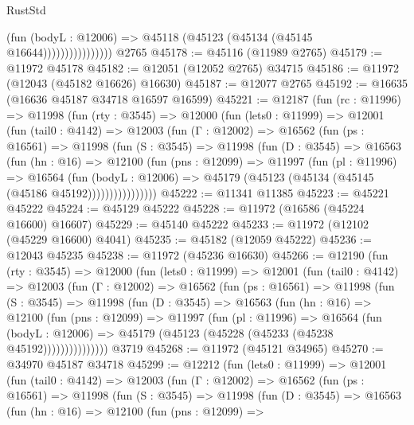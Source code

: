 \begin{lexlean}{RustStd}
\begin{coremodule}
                            (fun (bodyL : @12006) =>
                            @45118 (@45123 (@45134 (@45145 @16644))))))))))))))))
    @2765
@45178 := @45116 (@11989 @2765)
@45179 := @11972 @45178
@45182 := @12051 (@12052 @2765) @34715
@45186 := @11972 (@12043 (@45182 @16626) @16630)
@45187 := @12077 @2765
@45192 := @16635 (@16636 @45187 @34718 @16597 @16599)
@45221 := @12187
    (fun (rc : @11996) =>
    @11998
      (fun (rty : @3545) =>
      @12000
        (fun (lets0 : @11999) =>
        @12001
          (fun (tail0 : @4142) =>
          @12003
            (fun (Γ : @12002) =>
            @16562
              (fun (ps : @16561) =>
              @11998
                (fun (S : @3545) =>
                @11998
                  (fun (D : @3545) =>
                  @16563
                    (fun (hn : @16) =>
                    @12100
                      (fun (pns : @12099) =>
                      @11997
                        (fun (pl : @11996) =>
                        @16564
                          (fun (bodyL : @12006) =>
                          @45179 (@45123 (@45134 (@45145 (@45186 @45192))))))))))))))))
@45222 := @11341 @11385
@45223 := @45221 @45222
@45224 := @45129 @45222
@45228 := @11972 (@16586 (@45224 @16600) @16607)
@45229 := @45140 @45222
@45233 := @11972 (@12102 (@45229 @16600) @4041)
@45235 := @45182 (@12059 @45222)
@45236 := @12043 @45235
@45238 := @11972 (@45236 @16630)
@45266 := @12190
    (fun (rty : @3545) =>
    @12000
      (fun (lets0 : @11999) =>
      @12001
        (fun (tail0 : @4142) =>
        @12003
          (fun (Γ : @12002) =>
          @16562
            (fun (ps : @16561) =>
            @11998
              (fun (S : @3545) =>
              @11998
                (fun (D : @3545) =>
                @16563
                  (fun (hn : @16) =>
                  @12100
                    (fun (pns : @12099) =>
                    @11997
                      (fun (pl : @11996) =>
                      @16564
                        (fun (bodyL : @12006) =>
                        @45179 (@45123 (@45228 (@45233 (@45238 @45192)))))))))))))))
    @3719
@45268 := @11972 (@45121 @34965)
@45270 := @34970 @45187 @34718
@45299 := @12212
    (fun (lets0 : @11999) =>
    @12001
      (fun (tail0 : @4142) =>
      @12003
        (fun (Γ : @12002) =>
        @16562
          (fun (ps : @16561) =>
          @11998
            (fun (S : @3545) =>
            @11998
              (fun (D : @3545) =>
              @16563
                (fun (hn : @16) =>
                @12100
                  (fun (pns : @12099) =>

\end{coremodule}
\end{lexlean}
